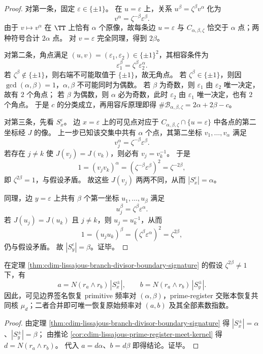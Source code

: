 \begin{proof}
对第一条，固定 \(\varepsilon\in\{\pm1\}\)。
在 \(u=\varepsilon\) 上，关系 \(u^\beta=\zeta^\beta v^\alpha\) 化为
\[
v^\alpha=\zeta^{-\beta}\varepsilon^\beta.
\]
由于 \(v\mapsto v^\alpha\) 在 \(\TT\) 上恰有 \(\alpha\) 个原像，故每条边 \(u=\varepsilon\) 与 \(C_{\alpha,\beta,\zeta}\) 恰交于 \(\alpha\) 点；两种符号合计 \(2\alpha\) 点。
对 \(v=\varepsilon\) 完全同理，得到 \(2\beta\)。
\par
对第二条，角点满足 \((u,v)=(\varepsilon_1,\varepsilon_2)\in\{\pm1\}^2\)，其相容条件为
\[
\varepsilon_1^\beta=\zeta^\beta \varepsilon_2^\alpha.
\]
若 \(\zeta^\beta\notin\{\pm1\}\)，则右端不可能取值于 \(\{\pm1\}\)，故无角点。
若 \(\zeta^\beta\in\{\pm1\}\)，则因 \(\gcd(\alpha,\beta)=1\)，\(\alpha,\beta\) 不可能同时为偶数。
若 \(\beta\) 为奇数，则 \(\varepsilon_1\) 由 \(\varepsilon_2\) 唯一决定，故有 \(2\) 个角点；
若 \(\beta\) 为偶数，则 \(\alpha\) 必为奇数，此时 \(\varepsilon_2\) 由 \(\varepsilon_1\) 唯一决定，也有 \(2\) 个角点。
于是 \(c\) 的分类成立，再用容斥原理即得 \(\#\mathscr B_{\alpha,\beta,\zeta}=2\alpha+2\beta-c\)。
\par
对第三条，先看 \(S_x^\varepsilon\)。
边 \(x=\varepsilon\) 上的可见点对应于 \(C_{\alpha,\beta,\zeta}\cap\{u=\varepsilon\}\) 中各点的第二坐标经 \(J\) 的像。
上一步已知该交集中共有 \(\alpha\) 个点，其第二坐标 \(v_1,\dots,v_\alpha\) 满足
\[
v_j^\alpha=\zeta^{-\beta}\varepsilon^\beta.
\]
若存在 \(j\neq k\) 使 \(J(v_j)=J(v_k)\)，则必有 \(v_j=v_k^{-1}\)。
于是
\[
1=(v_jv_k)^\alpha=(\zeta^{-\beta}\varepsilon^\beta)^2=\zeta^{-2\beta},
\]
即 \(\zeta^{2\beta}=1\)，与假设矛盾。
故这些 \(J(v_j)\) 两两不同，从而 \(|S_x^\varepsilon|=\alpha\)。
\par
同理，边 \(y=\varepsilon\) 上共有 \(\beta\) 个第一坐标 \(u_1,\dots,u_\beta\) 满足
\[
u_j^\beta=\zeta^\beta \varepsilon^\alpha.
\]
若 \(J(u_j)=J(u_k)\) 且 \(j\neq k\)，则 \(u_j=u_k^{-1}\)，从而
\[
1=(u_ju_k)^\beta=(\zeta^\beta \varepsilon^\alpha)^2=\zeta^{2\beta},
\]
仍与假设矛盾。
故 \(|S_y^\varepsilon|=\beta\)。证毕。
\end{proof}

\begin{corollary}[边界签名与核账本的联合恢复]\label{cor:cdim-lissajous-boundary-kernel-recovery}
在定理 \ref{thm:cdim-lissajous-branch-divisor-boundary-signature} 的假设 \(\zeta^{2\beta}\neq1\) 下，有
\[
a=N(r_a\wedge r_b)\,|S_x^\pm|,
\qquad
b=N(r_a\wedge r_b)\,|S_y^\pm|.
\]
因此，可见边界签名恢复 primitive 频率对 \((\alpha,\beta)\)，prime-register 交账本恢复共同核 \(\mu_d\)；二者合并即可唯一恢复原始频率对 \((a,b)\) 及其全部素数指数。
\end{corollary}
\begin{proof}
由定理 \ref{thm:cdim-lissajous-branch-divisor-boundary-signature} 得 \(|S_x^\pm|=\alpha\)、\(|S_y^\pm|=\beta\)；
由推论 \ref{cor:cdim-lissajous-prime-register-meet-kernel} 得 \(d=N(r_a\wedge r_b)\)。
代入 \(a=d\alpha\)、\(b=d\beta\) 即得结论。证毕。
\end{proof}

